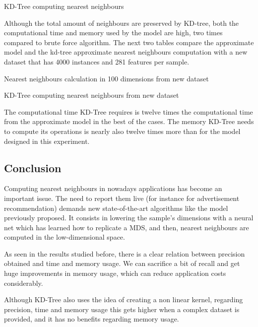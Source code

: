 \documentclass[a4paper,11pt,spanish]{report}
\begin{document}
\begin{table}[h]
\centering

\caption{\label{metrics24}KD-Tree computing nearest neighbours}
\end{table}

Although the total amount of neighbours are preserved by KD-tree, both the computational time and memory used by the model are high, two times compared to brute force algorithm. The next two tables compare the approximate model and the kd-tree approximate nearest neighbours computation with a new dataset that has 4000 instances and 281 features per sample.

\begin{table}[h]
\centering

\caption{\label{metrics25}Nearest neighbours calculation in 100 dimensions from new dataset}
\end{table}

\begin{table}[h]
\centering

\caption{\label{metrics26}KD-Tree computing nearest neighbours from new dataset}
\end{table}

The computational time KD-Tree requires is twelve times the computational time from the approximate model in the best of the cases. The memory KD-Tree needs to compute its operations is nearly also twelve times more than for the model designed in this experiment.

\subsection{Conclusion}
\label{ssec:conc2}

Computing nearest neighbours in nowadays applications has become an important issue. The need to report them live (for instance for advertisement recommendation) demands new state-of-the-art algorithms like the model previously proposed. It consists in lowering the sample's dimensions with a neural net which has learned how to replicate a MDS, and then, nearest neighbours are computed in the low-dimensional space.

As seen in the results studied before, there is a clear relation between precision obtained and time and memory usage. We can sacrifice a bit of recall and get huge improvements in memory usage, which can reduce application costs considerably.

Although KD-Tree also uses the idea of creating a non linear kernel, regarding precision, time and memory usage this gets higher when a complex dataset is provided, and it has no benefits regarding memory usage. 
\end{document}
